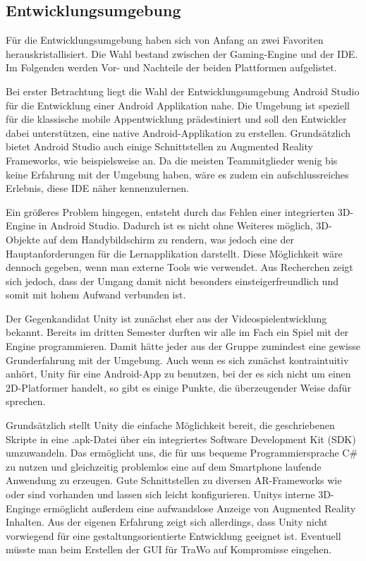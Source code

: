 \subsection{Entwicklungsumgebung}\label{entwicklungsumgebung}
Für die Entwicklungsumgebung haben sich von Anfang an zwei Favoriten herauskristallisiert. Die Wahl bestand zwischen der Gaming-Engine  und der  IDE. Im Folgenden werden Vor- und Nachteile der beiden Plattformen aufgelistet.

Bei erster Betrachtung liegt die Wahl der Entwicklungsumgebung Android Studio für die Entwicklung einer Android Applikation nahe. Die Umgebung ist speziell für die klassische mobile Appentwicklung prädestiniert und soll den Entwickler dabei unterstützen, eine native Android-Applikation zu erstellen. Grundsätzlich bietet Android Studio auch einige Schnittstellen zu Augmented Reality Frameworks, wie beispielsweise  an. Da die meisten Teammitglieder wenig bis keine Erfahrung mit der Umgebung haben, wäre es zudem ein aufschlussreiches Erlebnis, diese IDE näher kennenzulernen.

Ein größeres Problem hingegen, entsteht durch das Fehlen einer integrierten 3D-Engine in Android Studio. Dadurch ist es nicht ohne Weiteres möglich, 3D-Objekte auf dem Handybildschirm zu rendern, was jedoch eine der Hauptanforderungen für die Lernapplikation darstellt. Diese Möglichkeit wäre dennoch gegeben, wenn man externe Tools wie  verwendet. Aus Recherchen zeigt sich jedoch, dass der Umgang damit nicht besonders einsteigerfreundlich und somit mit hohem Aufwand verbunden ist.

Der Gegenkandidat Unity ist zunächst eher aus der Videospielentwicklung bekannt. Bereits im dritten Semester durften wir alle im Fach  ein Spiel mit der Engine programmieren. Damit hätte jeder aus der Gruppe zumindest eine gewisse Grunderfahrung mit der Umgebung. Auch wenn es sich zunächst kontraintuitiv anhört, Unity für eine Android-App zu benutzen, bei der es sich nicht um einen 2D-Platformer handelt, so gibt es einige Punkte, die überzeugender Weise dafür sprechen.

Grundsätzlich stellt Unity die einfache Möglichkeit bereit, die geschriebenen Skripte in eine .apk-Datei über ein integriertes Software Development Kit (SDK) umzuwandeln. Das ermöglicht uns, die für uns bequeme Programmiersprache C\# zu nutzen und gleichzeitig problemlos eine auf dem Smartphone laufende Anwendung zu erzeugen. Gute Schnittstellen zu diversen AR-Frameworks wie  oder  sind vorhanden und lassen sich leicht konfigurieren. Unitys interne 3D-Enginge ermöglicht außerdem eine aufwandslose Anzeige von Augmented Reality Inhalten. Aus der eigenen Erfahrung zeigt sich allerdings, dass Unity nicht vorwiegend für eine gestaltungsorientierte Entwicklung geeignet ist. Eventuell müsste man beim Erstellen der GUI für TraWo auf Kompromisse eingehen.

